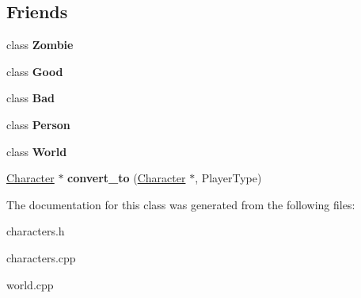 \subsection*{Friends}
\begin{DoxyCompactItemize}
\item 
\hypertarget{class_character_a32c4cbc64da4f589025482133657589e}{class {\bfseries Zombie}}\label{class_character_a32c4cbc64da4f589025482133657589e}

\item 
\hypertarget{class_character_a3746da06cf8650489c4321e2a0022743}{class {\bfseries Good}}\label{class_character_a3746da06cf8650489c4321e2a0022743}

\item 
\hypertarget{class_character_aebdac9a0d6fcff47d9941dff13c911e6}{class {\bfseries Bad}}\label{class_character_aebdac9a0d6fcff47d9941dff13c911e6}

\item 
\hypertarget{class_character_a4f3ed79e13d2ed83c864a5f03626c4ff}{class {\bfseries Person}}\label{class_character_a4f3ed79e13d2ed83c864a5f03626c4ff}

\item 
\hypertarget{class_character_a7b4bcdf992c21ae83363f25df05b1d25}{class {\bfseries World}}\label{class_character_a7b4bcdf992c21ae83363f25df05b1d25}

\item 
\hypertarget{class_character_af456b5f771ae803ac2f56c8b7efe743c}{\hyperlink{class_character}{Character} $\ast$ {\bfseries convert\-\_\-to} (\hyperlink{class_character}{Character} $\ast$, Player\-Type)}\label{class_character_af456b5f771ae803ac2f56c8b7efe743c}

\end{DoxyCompactItemize}


The documentation for this class was generated from the following files\-:\begin{DoxyCompactItemize}
\item 
characters.\-h\item 
characters.\-cpp\item 
world.\-cpp\end{DoxyCompactItemize}
